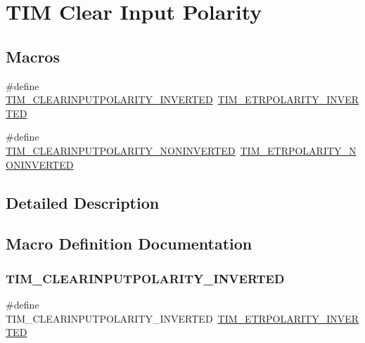 \hypertarget{group___t_i_m___clear_input___polarity}{}\section{T\+IM Clear Input Polarity}
\label{group___t_i_m___clear_input___polarity}
\subsection*{Macros}
\begin{DoxyCompactItemize}
\item 
\#define \mbox{\hyperlink{group___t_i_m___clear_input___polarity_ga02e0d10a2cf90016d1a8be1931c6c67e}{T\+I\+M\+\_\+\+C\+L\+E\+A\+R\+I\+N\+P\+U\+T\+P\+O\+L\+A\+R\+I\+T\+Y\+\_\+\+I\+N\+V\+E\+R\+T\+ED}}~\mbox{\hyperlink{group___t_i_m___e_t_r___polarity_ga42652ff688f0042659f8304ae08abfa6}{T\+I\+M\+\_\+\+E\+T\+R\+P\+O\+L\+A\+R\+I\+T\+Y\+\_\+\+I\+N\+V\+E\+R\+T\+ED}}
\item 
\#define \mbox{\hyperlink{group___t_i_m___clear_input___polarity_ga53e02f7692e6996389b462219572f2a9}{T\+I\+M\+\_\+\+C\+L\+E\+A\+R\+I\+N\+P\+U\+T\+P\+O\+L\+A\+R\+I\+T\+Y\+\_\+\+N\+O\+N\+I\+N\+V\+E\+R\+T\+ED}}~\mbox{\hyperlink{group___t_i_m___e_t_r___polarity_ga7fa7c43245b25564414b2e191d5d8b14}{T\+I\+M\+\_\+\+E\+T\+R\+P\+O\+L\+A\+R\+I\+T\+Y\+\_\+\+N\+O\+N\+I\+N\+V\+E\+R\+T\+ED}}
\end{DoxyCompactItemize}


\subsection{Detailed Description}


\subsection{Macro Definition Documentation}
\mbox{\label{group___t_i_m___clear_input___polarity_ga02e0d10a2cf90016d1a8be1931c6c67e}} 
\subsubsection{\texorpdfstring{TIM\_CLEARINPUTPOLARITY\_INVERTED}{TIM\_CLEARINPUTPOLARITY\_INVERTED}}
{\footnotesize\ttfamily \#define T\+I\+M\+\_\+\+C\+L\+E\+A\+R\+I\+N\+P\+U\+T\+P\+O\+L\+A\+R\+I\+T\+Y\+\_\+\+I\+N\+V\+E\+R\+T\+ED~\mbox{\hyperlink{group___t_i_m___e_t_r___polarity_ga42652ff688f0042659f8304ae08abfa6}{T\+I\+M\+\_\+\+E\+T\+R\+P\+O\+L\+A\+R\+I\+T\+Y\+\_\+\+I\+N\+V\+E\+R\+T\+ED}}}


